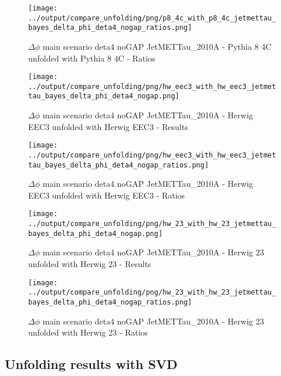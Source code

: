 \documentclass[11pt]{book}
\begin{document}
\begin{figure}[ht]
\centering
\texttt{[image: ../output/compare\_unfolding/png/p8\_4c\_with\_p8\_4c\_jetmettau\_bayes\_delta\_phi\_deta4\_nogap\_ratios.png]}
\caption{$\Delta\phi$ main scenario deta4 noGAP JetMETTau\_2010A - Pythia 8 4C unfolded with Pythia 8 4C - Ratios}
\label{p8_p8_jetmettau_bayes_delta_phi_deta4_nogap_b}
\end{figure}

\begin{figure}[ht]
\centering
\texttt{[image: ../output/compare\_unfolding/png/hw\_eec3\_with\_hw\_eec3\_jetmettau\_bayes\_delta\_phi\_deta4\_nogap.png]}
\caption{$\Delta\phi$ main scenario deta4 noGAP JetMETTau\_2010A - Herwig EEC3 unfolded with Herwig EEC3 - Results}
\label{hw_eec3_hw_eec3_jetmettau_bayes_delta_phi_deta4_nogap_a}
\end{figure}

\begin{figure}[ht]
\centering
\texttt{[image: ../output/compare\_unfolding/png/hw\_eec3\_with\_hw\_eec3\_jetmettau\_bayes\_delta\_phi\_deta4\_nogap\_ratios.png]}
\caption{$\Delta\phi$ main scenario deta4 noGAP JetMETTau\_2010A - Herwig EEC3 unfolded with Herwig EEC3 - Ratios}
\label{hw_eec3_hw_eec3_jetmettau_bayes_delta_phi_deta4_nogap_b}
\end{figure}

\begin{figure}[ht]
\centering
\texttt{[image: ../output/compare\_unfolding/png/hw\_23\_with\_hw\_23\_jetmettau\_bayes\_delta\_phi\_deta4\_nogap.png]}
\caption{$\Delta\phi$ main scenario deta4 noGAP JetMETTau\_2010A - Herwig 23 unfolded with Herwig 23 - Results}
\label{hw_23_hw_23_jetmettau_bayes_delta_phi_deta4_nogap_a}
\end{figure}

\begin{figure}[ht]
\centering
\texttt{[image: ../output/compare\_unfolding/png/hw\_23\_with\_hw\_23\_jetmettau\_bayes\_delta\_phi\_deta4\_nogap\_ratios.png]}
\caption{$\Delta\phi$ main scenario deta4 noGAP JetMETTau\_2010A - Herwig 23 unfolded with Herwig 23 - Ratios}
\label{hw_23_hw_23_jetmettau_bayes_delta_phi_deta4_nogap_b}
\end{figure}

\clearpage
\subsection{Unfolding results with SVD}
\end{document}
